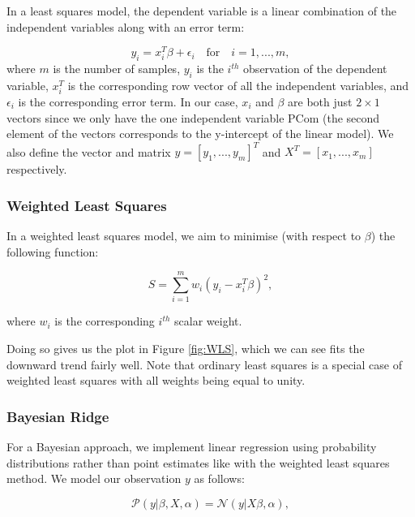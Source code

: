 \documentclass[11pt]{article}
\begin{document}
In a least squares model, the dependent variable is a linear combination of the independent variables along with an error term:

\begin{equation}
	\label{eq:LS}
    y_{i}=x^{T}_{i}\beta + \epsilon_{i} \quad \textrm{for} \quad i=1,...,m,
\end{equation}
where $m$ is the number of samples, $y_{i}$ is the $i^{th}$ observation of the dependent variable, $x^{T}_{i}$ is the corresponding row vector of all the independent variables, and $\epsilon_{i}$ is the corresponding error term. In our case, $x_{i}$ and $\beta$ are both just $2\times1$ vectors since we only have the one independent variable PCom (the second element of the vectors corresponds to the y-intercept of the linear model). We also define the vector and matrix $y = [y_{1},...,y_{m}]^{T}$ and $X^{T} = [x_{1},...,x_{m}]$ respectively.


\subsubsection*{Weighted Least Squares}

In a weighted least squares model, we aim to minimise (with respect to $\beta$) the following function:

\begin{equation}
	\label{eq:WLS}
    S=\sum^{m}_{i=1} w_{i}(y_{i}-x^{T}_{i}\beta)^{2},
\end{equation}

where $w_{i}$ is the corresponding $i^{th}$ scalar weight.

Doing so gives us the plot in Figure \ref{fig:WLS}, which we can see fits the downward trend fairly well. Note that ordinary least squares is a special case of weighted least squares with all weights being equal to unity.

\subsubsection*{Bayesian Ridge}
For a Bayesian approach, we implement linear regression using probability distributions rather than point estimates like with the weighted least squares method. We model our observation $y$ as follows:

\begin{equation}
	\label{eq:likelihood}
    \mathcal{P}(y | \beta, X, \alpha) = \mathcal{N}(y | X\beta, \alpha),
\end{equation}
\end{document}
